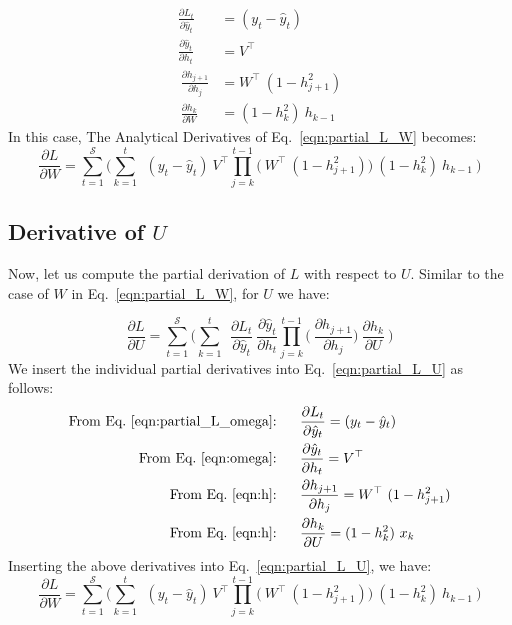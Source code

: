 \documentclass{article}
\begin{document}
\begin{align*}
        \frac{\partial L_t}{\partial \hat{y}_t} &= (y_t - \hat{y}_t)\\
        \frac{\partial \hat{y}_t}{\partial h_t}
        &= V^\top \\
        ~\frac{\partial h_{j+1}}{\partial h_{j}}
        &= W^\top ~ (1 - h_{j+1}^2) \\
        ~\frac{\partial h_k}{\partial W}&= (1-h_k^2)~ h_{k-1}
\end{align*}
In this case, The Analytical Derivatives of Eq.~\eqref{eqn:partial_L_W} becomes:
\begin{equation}
	\frac{\partial L}{ \partial{W}} = \sum_{t=1}^{\mathcal{S}} 
	\bigg(	
	 \sum_{k=1}^{t} ~
	~(y_t - \hat{y}_t)
	~V^\top
        \prod_{j=k}^{t-1} \bigg(
	~W^\top ~ (1 - h_{j+1}^2)
        \bigg)
	~(1-h_k^2)~ h_{k-1}~
	\bigg) 
 \label{eqn:partial_L_aW}
\end{equation}
\subsection{Derivative of $U$}
Now, let us compute the partial derivation of $L$ with respect to $U$. Similar to the case of $W$ in Eq.~\eqref{eqn:partial_L_W}, for $U$ we have:

\begin{equation}
	\frac{\partial L}{ \partial{U}} = \sum_{t=1}^{\mathcal{S}} 
	\bigg(	
	 \sum_{k=1}^{t} ~
	~\frac{\partial L_t}{\partial \hat{y}_t}
	~\frac{\partial \hat{y}_t}{\partial h_t}
        \prod_{j=k}^{t-1} \bigg(
	~\frac{\partial h_{j+1}}{\partial h_{j}}
        \bigg)
	~\frac{\partial h_k}{\partial U}~
	\bigg) 
 \label{eqn:partial_L_U}
\end{equation}
We insert the individual partial derivatives into Eq.~\eqref{eqn:partial_L_U} as follows:
\begin{align*}
        \text{From Eq.~\eqref{eqn:partial_L_omega}:}~~~~~&\frac{\partial L_t}{\partial \hat{y}_t} = (y_t - \hat{y}_t)  \\
        \text{From Eq.~\eqref{eqn:omega}:} ~~~~~&\frac{\partial \hat{y}_t}{\partial h_t} = V^\top \\
        \text{From Eq.~\eqref{eqn:h}:}~~~~~&\frac{\partial h_{j+1}}{\partial h_{j}} 
        = W^\top ~ (1 - h_{j+1}^2)\\
        \text{From Eq.~\eqref{eqn:h}:}~~~~~&\frac{\partial h_k}{\partial U}= (1-h_k^2)~ x_{k} 
\end{align*}
Inserting the above derivatives into Eq.~\eqref{eqn:partial_L_U}, we have:
\begin{equation}
	\frac{\partial L}{ \partial{W}} = \sum_{t=1}^{\mathcal{S}} 
	\bigg(	
	 \sum_{k=1}^{t} ~
	~(y_t - \hat{y}_t)
	~V^\top
        \prod_{j=k}^{t-1} \bigg(
	~W^\top ~ (1 - h_{j+1}^2)
        \bigg)
	~(1-h_k^2)~ h_{k-1}~
	\bigg) 
 \label{eqn:partial_L_aU}
\end{equation}
\end{document}
